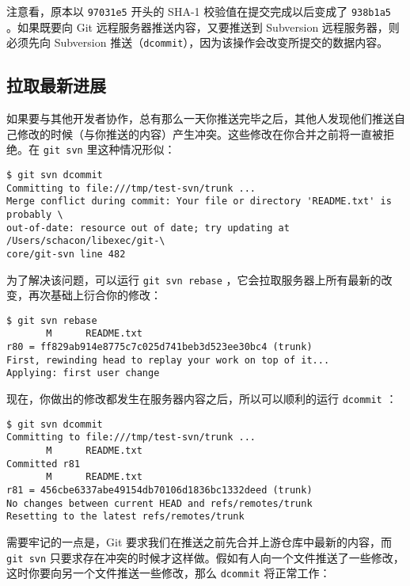 \documentclass[a4paper]{book}
\begin{document}
注意看，原本以 \texttt{97031e5} 开头的 SHA-1 校验值在提交完成以后变成了 \texttt{938b1a5} 。如果既要向 Git 远程服务器推送内容，又要推送到 Subversion 远程服务器，则必须先向 Subversion 推送（\texttt{dcommit}），因为该操作会改变所提交的数据内容。

\subsection{拉取最新进展}

如果要与其他开发者协作，总有那么一天你推送完毕之后，其他人发现他们推送自己修改的时候（与你推送的内容）产生冲突。这些修改在你合并之前将一直被拒绝。在 \texttt{git svn} 里这种情况形似：

\begin{shaded}\begin{verbatim}
$ git svn dcommit
Committing to file:///tmp/test-svn/trunk ...
Merge conflict during commit: Your file or directory 'README.txt' is probably \
out-of-date: resource out of date; try updating at /Users/schacon/libexec/git-\
core/git-svn line 482
\end{verbatim}\end{shaded}

为了解决该问题，可以运行 \texttt{git svn rebase} ，它会拉取服务器上所有最新的改变，再次基础上衍合你的修改：

\begin{shaded}\begin{verbatim}
$ git svn rebase
       M      README.txt
r80 = ff829ab914e8775c7c025d741beb3d523ee30bc4 (trunk)
First, rewinding head to replay your work on top of it...
Applying: first user change
\end{verbatim}\end{shaded}

现在，你做出的修改都发生在服务器内容之后，所以可以顺利的运行 \texttt{dcommit} ：

\begin{shaded}\begin{verbatim}
$ git svn dcommit
Committing to file:///tmp/test-svn/trunk ...
       M      README.txt
Committed r81
       M      README.txt
r81 = 456cbe6337abe49154db70106d1836bc1332deed (trunk)
No changes between current HEAD and refs/remotes/trunk
Resetting to the latest refs/remotes/trunk
\end{verbatim}\end{shaded}

需要牢记的一点是，Git 要求我们在推送之前先合并上游仓库中最新的内容，而 \texttt{git svn} 只要求存在冲突的时候才这样做。假如有人向一个文件推送了一些修改，这时你要向另一个文件推送一些修改，那么 \texttt{dcommit} 将正常工作：
\end{document}
